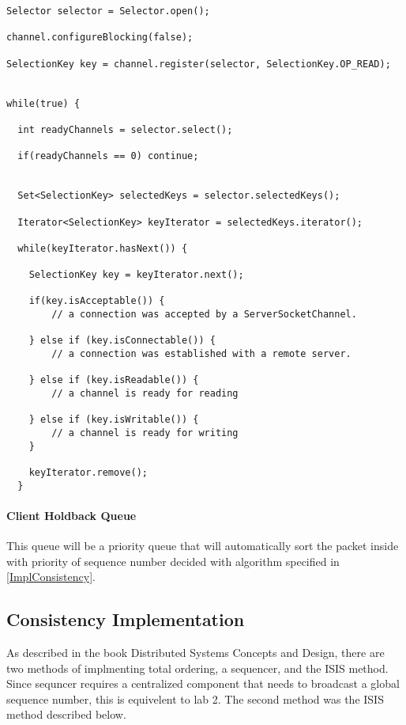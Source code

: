 {
\singlespacing
\begin{lstlisting}[caption = {[ClientListener.java]Sample code of Selector monitoring a list of channel}, label = CodeSelector]
Selector selector = Selector.open();

channel.configureBlocking(false);

SelectionKey key = channel.register(selector, SelectionKey.OP_READ);


while(true) {

  int readyChannels = selector.select();

  if(readyChannels == 0) continue;


  Set<SelectionKey> selectedKeys = selector.selectedKeys();

  Iterator<SelectionKey> keyIterator = selectedKeys.iterator();

  while(keyIterator.hasNext()) {

    SelectionKey key = keyIterator.next();

    if(key.isAcceptable()) {
        // a connection was accepted by a ServerSocketChannel.

    } else if (key.isConnectable()) {
        // a connection was established with a remote server.

    } else if (key.isReadable()) {
        // a channel is ready for reading

    } else if (key.isWritable()) {
        // a channel is ready for writing
    }

    keyIterator.remove();
  }
\end{lstlisting}
}

\paragraph*{Client Holdback Queue}

This queue will be a priority queue that will automatically sort the packet inside with priority of sequence number decided with algorithm specified in \ref{ImplConsistency}.

\subsection*{Consistency Implementation}\label{ImplConsistency}

As described in the book Distributed Systems Concepts and Design, there are two methods of implmenting total ordering, a sequencer, and the ISIS method. Since sequncer requires a centralized component that needs to broadcast a global sequence number, this is equivelent to lab 2. The second method was the ISIS method described below.

